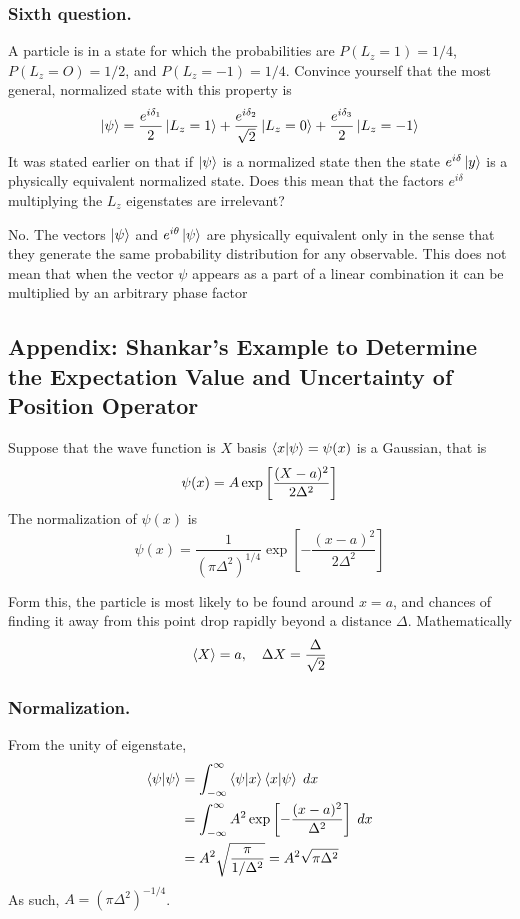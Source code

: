 \documentclass[../../../main.tex]{subfiles}
\begin{document}
\subsubsection{Sixth question.}
A particle is in a state for which the probabilities are $P(L_z=1)=1/4$, $P(L_z=O)=1/2$, and $P(L_z =-1)= 1 /4$.
Convince yourself that the most general, normalized state with this property is
\begin{equation*}
    \ket{\psi}=\frac{e^{i\delta_1 }}{2 }\ket{L_z=1}+\frac{e^{i \delta_2 }}{\sqrt{2 }}\ket{L_z=0}+\frac{e^{i \delta_3 }}{2}\ket{L_z=-1}
\end{equation*}
It was stated earlier on that if $\ket{\psi}$ is a normalized state then the state $e^{i\delta}\ket{y}$ is a physically equivalent normalized state.
Does this mean that the factors $e^{i\delta}$ multiplying the $L_z$ eigenstates are irrelevant?

No.
The vectors $\ket{\psi}$ and $e^{i\theta}\ket{\psi}$ are physically equivalent only in the sense that they generate the same probability distribution for any observable.
This does not mean that when the vector $\psi$ appears as a part of a linear combination it can be multiplied by an arbitrary phase factor

\subsection{Appendix: Shankar's Example to Determine the Expectation Value and Uncertainty of Position Operator}
Suppose that the wave function is $X$ basis $\braket{x|\psi}=\psi(x)$ is a Gaussian, that is
\begin{equation*}
    \psi(x)=A \exp \left[ \-\frac{(X-a)^2 }{2\Delta^2} \right]
\end{equation*}
The normalization of $\psi(x )$ is
\begin{equation*}
    \psi(x)=\frac{1 }{(\pi\Delta^2)^{1/4}}\exp \left[ -\frac{(x-a )^2}{2\Delta^2} \right]
\end{equation*}

Form this, the particle is most likely to be found around $x =a$, and chances of finding it away from this point drop rapidly beyond a distance $\Delta$.
Mathematically
\begin{equation*}
    \braket{X}=a,\quad\Delta X=\frac{\Delta}{\sqrt{2}}
\end{equation*}

\subsubsection{Normalization.}
From the  unity of eigenstate,
\begin{align*}
    \braket{\psi|\psi} & = \int_{-\infty}^{\infty} \braket{\psi|x}\braket{x|\psi}\;dx                    \\
                       & = \int_{-\infty}^{\infty} A^2\exp \left[ -\frac{(x-a)^2}{\Delta^2} \right] \;dx \\
                       & = A^2 \sqrt{\frac{\pi }{1/\Delta^2}}=A^2 \sqrt{\pi \Delta^2}
\end{align*}
As such, $A=(\pi\Delta^2)^{-1/4}$.
\end{document}
